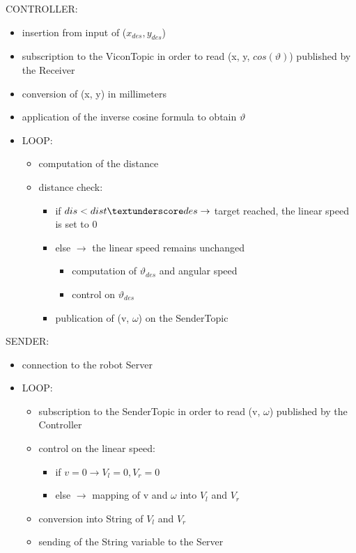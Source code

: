 \documentclass[a4paper,11pt,oneside]{book}
\begin{document}
CONTROLLER:

\begin{itemize}
\item insertion from input of ($x_{des}, y_{des}$)
\item subscription to the ViconTopic in order to read (x, y, $cos(\vartheta)$) published by the Receiver
\item conversion of (x, y) in millimeters
\item application of the inverse cosine formula to obtain $\vartheta$
\item LOOP:
\begin{itemize}
\item computation of the distance
\item distance check:
\begin{itemize}
\item if $dis < dist\textunderscore des \rightarrow$ target reached, the linear speed is set to 0
\item else $\rightarrow$ the linear speed remains unchanged
\begin{itemize}
\item computation of $\vartheta_{des}$ and angular speed
\item control on $\vartheta_{des}$
\end{itemize}
\item publication of (v, $\omega$) on the SenderTopic
\end{itemize}
\end{itemize}
\end{itemize}

SENDER:
\begin{itemize}
\item connection to the robot Server
\item LOOP:
\begin{itemize}
\item subscription to the SenderTopic in order to read (v, $\omega$) published by the Controller
\item control on the linear speed:
\begin{itemize}
\item if $v = 0 \rightarrow V_l = 0, V_r = 0$
\item else $ \rightarrow $ mapping of v and $\omega$ into $V_l$ and $V_r$
\end{itemize}
\item conversion into String of $V_l$ and $V_r$
\item sending of the String variable to the Server
\end{itemize}
\end{itemize}
\end{document}
